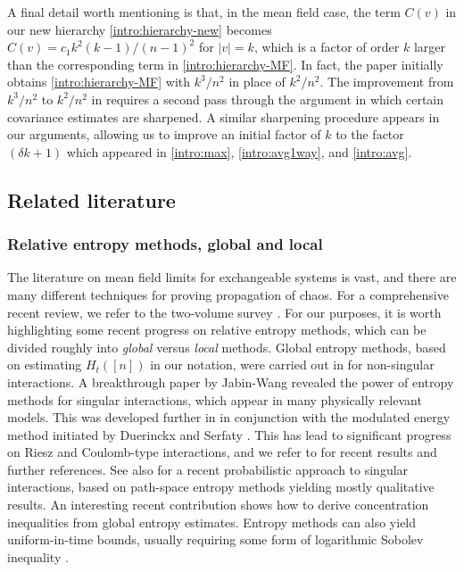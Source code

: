 \documentclass[11pt,reqno]{amsart}
\numberwithin{equation}{section}
\theoremstyle{definition}
\begin{document}
A final detail worth mentioning is that, in the mean field case, the term $C(v)$ in our new hierarchy \eqref{intro:hierarchy-new} becomes $C(v)=c_1k^2(k-1)/(n-1)^2$ for $|v|=k$, which is a factor of order $k$ larger than the corresponding term in \eqref{intro:hierarchy-MF}. In fact, the paper \cite{lacker2022hierarchies} initially obtains \eqref{intro:hierarchy-MF} with $k^3/n^2$ in place of $k^2/n^2$. The improvement from $k^3/n^2$ to $k^2/n^2$ in \cite{lacker2022hierarchies} requires a second pass through the argument in which certain covariance estimates are sharpened. A similar sharpening procedure appears in our arguments,  allowing us to improve an initial factor of $k$ to the factor $(\delta k + 1)$ which appeared in \eqref{intro:max}, \eqref{intro:avg1way}, and \eqref{intro:avg}.




\subsection{Related literature} \label{se:literature}




\subsubsection{Relative entropy methods, global and local}
The literature on mean field limits for exchangeable systems is vast, and there are many different techniques for proving propagation of chaos. For a comprehensive recent review, we refer to the two-volume survey \cite{chaintron2021propagation,chaintron2022propagation}. For our purposes, it is worth highlighting some recent progress on relative entropy methods, which can be divided roughly into \emph{global}  versus \emph{local} methods. Global entropy methods, based on estimating  $H_t([n])$ in our notation, were carried out in  \cite{arous1999increasing,jabin2016mean,jabir2019rate,lacker2018strong} for non-singular interactions. A breakthrough paper by Jabin-Wang \cite{jabin2018quantitative} revealed the power of entropy methods for singular interactions, which appear in many physically relevant models. This was developed further in \cite{bresch2023mean} in conjunction with the modulated energy method initiated by Duerinckx \cite{duerinckx2016mean} and Serfaty \cite{serfaty2020mean}. This has lead to significant progress on Riesz and Coulomb-type interactions, and we refer to \cite{de2023sharp,de2023attractive} for recent  results and further references.
 See also \cite{cattiaux2024entropy} for a recent probabilistic approach to singular interactions, based on path-space entropy methods yielding mostly qualitative results. An interesting recent contribution \cite{jackson2024concentration} shows how to derive concentration inequalities from global entropy estimates.
Entropy methods can also yield uniform-in-time bounds, usually requiring some form of logarithmic Sobolev inequality \cite{guillin2024uniform,rosenzweig2023modulated}.
 
\end{document}
